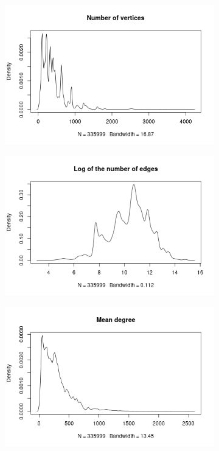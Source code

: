 \documentclass{l4proj}
\theoremstyle{definition}
\theoremstyle{remark}
\begin{document}
\begin{figure}
  \centering
  \begin{subfigure}[t]{0.49\textwidth}
    \centering
    \includegraphics[width=\textwidth]{images/vertices_density.png}
  \end{subfigure}
  \begin{subfigure}[t]{0.49\textwidth}
    \centering
    \includegraphics[width=\textwidth]{images/edges_density.png}
  \end{subfigure}
  \begin{subfigure}[t]{0.49\textwidth}
    \centering
    \includegraphics[width=\textwidth]{images/meandeg_density.png}

\end{subfigure}
\end{figure}
\end{document}
